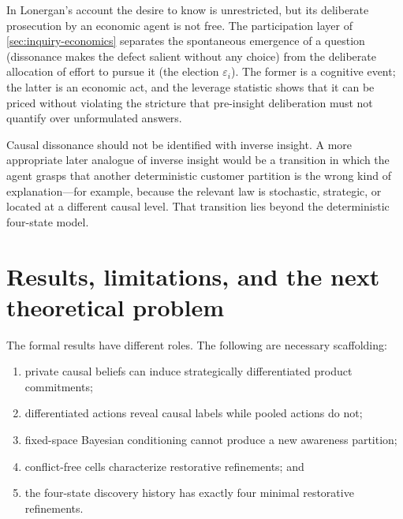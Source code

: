 \documentclass[11pt]{article}
\begin{document}
In Lonergan's account the desire to know is unrestricted, but its deliberate
prosecution by an economic agent is not free.  The participation layer of
\cref{sec:inquiry-economics} separates the spontaneous emergence of a question
(dissonance makes the defect salient without any choice) from the deliberate
allocation of effort to pursue it (the election $\varepsilon_i$).  The former
is a cognitive event; the latter is an economic act, and the leverage
statistic shows that it can be priced without violating the stricture that
pre-insight deliberation must not quantify over unformulated answers.

Causal dissonance should not be identified with inverse insight.  A more
appropriate later analogue of inverse insight would be a transition in which
the agent grasps that another deterministic customer partition is the wrong
kind of explanation---for example, because the relevant law is stochastic,
strategic, or located at a different causal level.  That transition lies beyond
the deterministic four-state model.

\section{Results, limitations, and the next theoretical problem}

The formal results have different roles.  The following are necessary
scaffolding:
\begin{enumerate}[label=(\roman*)]
  \item private causal beliefs can induce strategically differentiated product
  commitments;
  \item differentiated actions reveal causal labels while pooled actions do
  not;
  \item fixed-space Bayesian conditioning cannot produce a new awareness
  partition;
  \item conflict-free cells characterize restorative refinements; and
  \item the four-state discovery history has exactly four minimal restorative
  refinements.
\end{enumerate}
\end{document}
